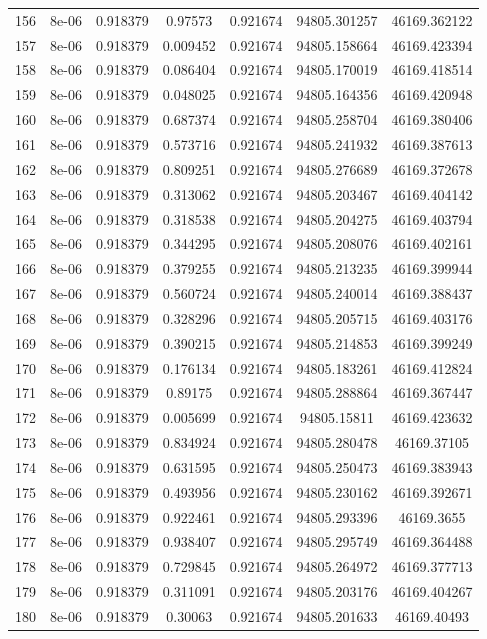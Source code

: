 \begin{table}
\begin{tabular*}{\linewidth}{c|c|c|c|c|c|c}
156 & 8e-06 & 0.918379 & 0.97573 & 0.921674 & 94805.301257 & 46169.362122\\
157 & 8e-06 & 0.918379 & 0.009452 & 0.921674 & 94805.158664 & 46169.423394\\
158 & 8e-06 & 0.918379 & 0.086404 & 0.921674 & 94805.170019 & 46169.418514\\
159 & 8e-06 & 0.918379 & 0.048025 & 0.921674 & 94805.164356 & 46169.420948\\
160 & 8e-06 & 0.918379 & 0.687374 & 0.921674 & 94805.258704 & 46169.380406\\
161 & 8e-06 & 0.918379 & 0.573716 & 0.921674 & 94805.241932 & 46169.387613\\
162 & 8e-06 & 0.918379 & 0.809251 & 0.921674 & 94805.276689 & 46169.372678\\
163 & 8e-06 & 0.918379 & 0.313062 & 0.921674 & 94805.203467 & 46169.404142\\
164 & 8e-06 & 0.918379 & 0.318538 & 0.921674 & 94805.204275 & 46169.403794\\
165 & 8e-06 & 0.918379 & 0.344295 & 0.921674 & 94805.208076 & 46169.402161\\
166 & 8e-06 & 0.918379 & 0.379255 & 0.921674 & 94805.213235 & 46169.399944\\
167 & 8e-06 & 0.918379 & 0.560724 & 0.921674 & 94805.240014 & 46169.388437\\
168 & 8e-06 & 0.918379 & 0.328296 & 0.921674 & 94805.205715 & 46169.403176\\
169 & 8e-06 & 0.918379 & 0.390215 & 0.921674 & 94805.214853 & 46169.399249\\
170 & 8e-06 & 0.918379 & 0.176134 & 0.921674 & 94805.183261 & 46169.412824\\
171 & 8e-06 & 0.918379 & 0.89175 & 0.921674 & 94805.288864 & 46169.367447\\
172 & 8e-06 & 0.918379 & 0.005699 & 0.921674 & 94805.15811 & 46169.423632\\
173 & 8e-06 & 0.918379 & 0.834924 & 0.921674 & 94805.280478 & 46169.37105\\
174 & 8e-06 & 0.918379 & 0.631595 & 0.921674 & 94805.250473 & 46169.383943\\
175 & 8e-06 & 0.918379 & 0.493956 & 0.921674 & 94805.230162 & 46169.392671\\
176 & 8e-06 & 0.918379 & 0.922461 & 0.921674 & 94805.293396 & 46169.3655\\
177 & 8e-06 & 0.918379 & 0.938407 & 0.921674 & 94805.295749 & 46169.364488\\
178 & 8e-06 & 0.918379 & 0.729845 & 0.921674 & 94805.264972 & 46169.377713\\
179 & 8e-06 & 0.918379 & 0.311091 & 0.921674 & 94805.203176 & 46169.404267\\
180 & 8e-06 & 0.918379 & 0.30063 & 0.921674 & 94805.201633 & 46169.40493\\
\end{tabular*}
\end{table}
